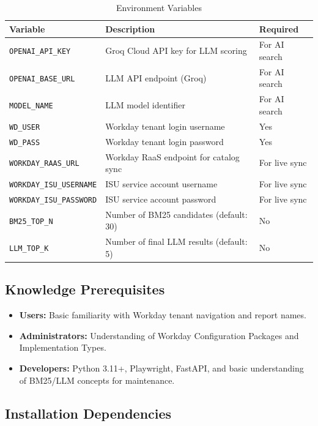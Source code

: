 \documentclass[12pt,a4paper]{article}
\begin{document}
\begin{table}[H]
\centering
\caption{Environment Variables}
\label{tab:env-vars}
\begin{tabularx}{\textwidth}{l X l}
\toprule
\textbf{Variable} & \textbf{Description} & \textbf{Required} \\
\midrule
\texttt{OPENAI\_API\_KEY} & Groq Cloud API key for LLM scoring & For AI search \\
\texttt{OPENAI\_BASE\_URL} & LLM API endpoint (Groq) & For AI search \\
\texttt{MODEL\_NAME} & LLM model identifier & For AI search \\
\texttt{WD\_USER} & Workday tenant login username & Yes \\
\texttt{WD\_PASS} & Workday tenant login password & Yes \\
\texttt{WORKDAY\_RAAS\_URL} & Workday RaaS endpoint for catalog sync & For live sync \\
\texttt{WORKDAY\_ISU\_USERNAME} & ISU service account username & For live sync \\
\texttt{WORKDAY\_ISU\_PASSWORD} & ISU service account password & For live sync \\
\texttt{BM25\_TOP\_N} & Number of BM25 candidates (default: 30) & No \\
\texttt{LLM\_TOP\_K} & Number of final LLM results (default: 5) & No \\
\bottomrule
\end{tabularx}
\end{table}

\subsection{Knowledge Prerequisites}
\label{subsec:knowledge-prerequisites}

\begin{itemize}[leftmargin=2em]
  \item \textbf{Users:} Basic familiarity with Workday tenant navigation and report names.
  \item \textbf{Administrators:} Understanding of Workday Configuration Packages and Implementation Types.
  \item \textbf{Developers:} Python 3.11+, Playwright, FastAPI, and basic understanding of BM25/LLM concepts for maintenance.
\end{itemize}

\subsection{Installation Dependencies}
\label{subsec:installation-dependencies}
\end{document}

